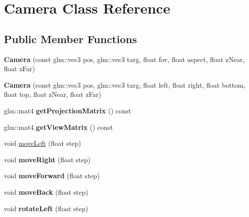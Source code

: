 \hypertarget{classCamera}{\section{Camera Class Reference}
\label{classCamera}
}
\subsection*{Public Member Functions}
\begin{DoxyCompactItemize}
\item 
\hypertarget{classCamera_a5f2c294d3d87bc07d79e6a4233d33e31}{{\bfseries Camera} (const glm\-::vec3 pos, glm\-::vec3 targ, float fov, float aspect, float z\-Near, float z\-Far)}\label{classCamera_a5f2c294d3d87bc07d79e6a4233d33e31}

\item 
\hypertarget{classCamera_a3303f128c523305dfbc5a24f1b06d320}{{\bfseries Camera} (const glm\-::vec3 pos, glm\-::vec3 targ, float left, float right, float bottom, float top, float z\-Near, float z\-Far)}\label{classCamera_a3303f128c523305dfbc5a24f1b06d320}

\item 
\hypertarget{classCamera_a8ceac1662a3b4bcde95094bb64c134ee}{glm\-::mat4 {\bfseries get\-Projection\-Matrix} () const }\label{classCamera_a8ceac1662a3b4bcde95094bb64c134ee}

\item 
\hypertarget{classCamera_a941940439c3704c7e5c75e6fd9fa6e7c}{glm\-::mat4 {\bfseries get\-View\-Matrix} () const }\label{classCamera_a941940439c3704c7e5c75e6fd9fa6e7c}

\item 
void \hyperlink{classCamera_a9733e299c281288208e4ce36681143a6}{move\-Left} (float step)
\item 
\hypertarget{classCamera_a70f638369d8bbcb60639f5b1cc40de19}{void {\bfseries move\-Right} (float step)}\label{classCamera_a70f638369d8bbcb60639f5b1cc40de19}

\item 
\hypertarget{classCamera_a8d10ea5b8790919325234395c7b04a6f}{void {\bfseries move\-Forward} (float step)}\label{classCamera_a8d10ea5b8790919325234395c7b04a6f}

\item 
\hypertarget{classCamera_aaa05f1c6290b5cb247ddd81a7b9d6b83}{void {\bfseries move\-Back} (float step)}\label{classCamera_aaa05f1c6290b5cb247ddd81a7b9d6b83}

\item 
\hypertarget{classCamera_a61e15d0587412375261ca39de2f4776b}{void {\bfseries rotate\-Left} (float step)}\label{classCamera_a61e15d0587412375261ca39de2f4776b}


\end{DoxyCompactItemize}
